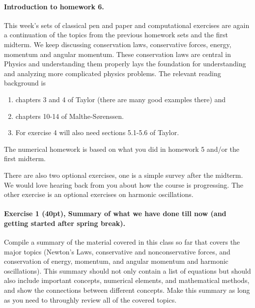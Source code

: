 \documentclass[%
oneside,                 %
final,                   %
10pt]{article}
\begin{document}
\noindent
\paragraph{Introduction to homework 6.}
This week's sets of classical pen and paper and computational
exercises are again a continuation of the topics from the previous homework sets and the first midterm. We keep
discussing conservation laws, conservative forces, energy, momentum and angular momentum. These conservation laws are central in Physics and understanding them properly lays the foundation for understanding and analyzing more complicated physics problems.
The relevant reading background is
\begin{enumerate}
\item chapters 3 and 4 of Taylor (there are many good examples there) and

\item chapters 10-14 of Malthe-Sørenssen.

\item For exercise 4 will also need sections 5.1-5.6 of Taylor.
\end{enumerate}

\noindent
The numerical homework is based on what you did in homework 5 and/or the first midterm.

There are also two optional exercises, one is a simple survey after the midterm. We would love hearing back from you about how the course is progressing.
The other exercise is an optional exercises on harmonic oscillations.

\paragraph{Exercise 1 (40pt), Summary of what we have done till now (and getting started after spring break).}
Compile a summary of the material covered in this class so far that
covers the major topics (Newton’s Laws, conservative and
nonconservative forces, and conservation of energy, momentum, and
angular momentum and harmonic oscillations).  This summary should not only contain a list of
equations but should also include important concepts, numerical
elements, and mathematical methods, and show the connections between
different concepts.  
Make this summary as long as you need to throughly review all of the
covered topics.
\end{document}
